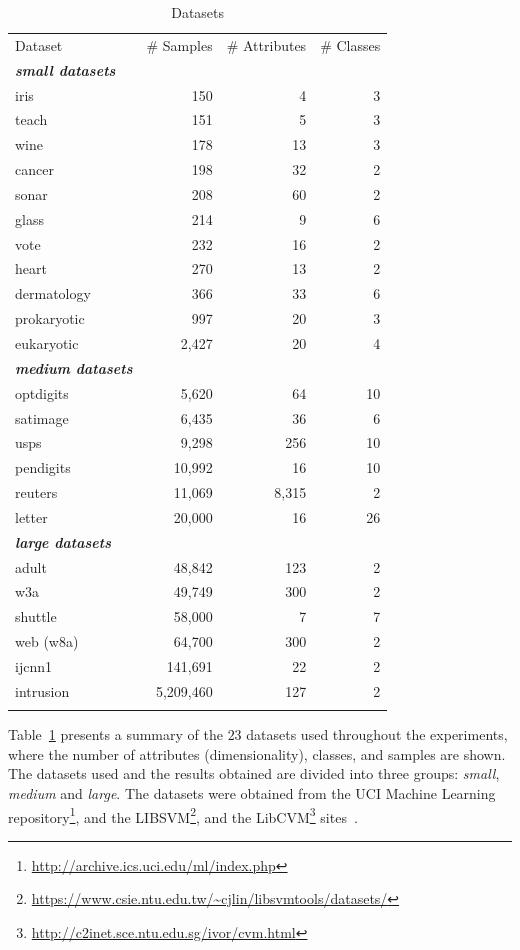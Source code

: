 \documentclass[reqno]{vcuthesis}
\numberwithin{equation}{chapter}
\begin{document}
\begin{table}[t!]
\caption{Datasets}
\footnotesize
\centering
\label{tab:ollawvDataset}
\begin{tabularx}{0.7\textwidth}{l@{\extracolsep{\fill}}rrr}
\hline\noalign{\smallskip}
Dataset & \# Samples & \# Attributes & \# Classes \\
\noalign{\smallskip}\hline\noalign{\smallskip}
\textbf{\textit{small datasets}} & \\
iris & 150 & 4 &  3  \\ 
teach & 151 & 5 &  3  \\ 
wine & 178 & 13 &  3  \\ 
cancer & 198 & 32 &  2  \\ 
sonar & 208 & 60 &  2  \\ 
glass & 214 & 9 &  6  \\ 
vote & 232 & 16 &  2  \\ 
heart & 270 & 13 &  2  \\ 
dermatology & 366 & 33 &  6  \\ 
prokaryotic & 997 & 20 &  3  \\ 
eukaryotic & 2,427 & 20 &  4  \\ 
\textbf{\textit{medium datasets}} & \\
optdigits & 5,620 & 64 &  10  \\ 
satimage & 6,435 & 36 &  6  \\ 
usps & 9,298 & 256 &  10  \\ 
pendigits & 10,992 & 16 &  10  \\ 
reuters & 11,069 & 8,315 &  2  \\ 
letter & 20,000 & 16 &  26  \\ 
\textbf{\textit{large datasets}} & \\
adult & 48,842 & 123 &  2  \\ 
w3a & 49,749 & 300 &  2  \\ 
shuttle & 58,000 & 7 &  7  \\ 
web (w8a) & 64,700 & 300 &  2  \\ 
ijcnn1 & 141,691 & 22 &  2  \\ 
intrusion & 5,209,460 & 127 &  2  \\  
\noalign{\smallskip}\hline
\end{tabularx}
\end{table}

Table~\ref{tab:ollawvDataset} presents a summary of the $23$ datasets used throughout the experiments, where the number of attributes (dimensionality), classes, and samples are shown. The datasets used and the results obtained are divided into three groups: \textit{small}, \textit{medium} and \textit{large}. The datasets were obtained from the UCI Machine Learning repository\footnote{\url{http://archive.ics.uci.edu/ml/index.php}}, and the LIBSVM\footnote{\url{https://www.csie.ntu.edu.tw/~cjlin/libsvmtools/datasets/}}, and the LibCVM\footnote{\url{http://c2inet.sce.ntu.edu.sg/ivor/cvm.html}} sites~\cite{Lichman:2013,CC01a,tsang2005core}. 
\end{document}
